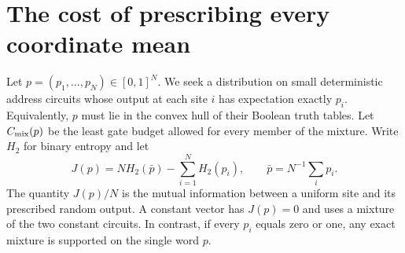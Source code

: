 \section{The cost of prescribing every coordinate mean}\label{sec:marginal}
Let $p=(p_1,\ldots,p_N)\in[0,1]^N$. We seek a distribution on small deterministic address circuits whose output at each site $i$ has expectation exactly $p_i$. Equivalently, $p$ must lie in the convex hull of their Boolean truth tables. Let $C_{\rm mix}(p)$ be the least gate budget allowed for every member of the mixture. Write $H_2$ for binary entropy and let
\[
 J(p)=N H_2(\bar p)-\sum_{i=1}^{N}H_2(p_i),\qquad
 \bar p=N^{-1}\sum_i p_i .
\]
The quantity $J(p)/N$ is the mutual information between a uniform site and its prescribed random output. A constant vector has $J(p)=0$ and uses a mixture of the two constant circuits. In contrast, if every $p_i$ equals zero or one, any exact mixture is supported on the single word $p$.

